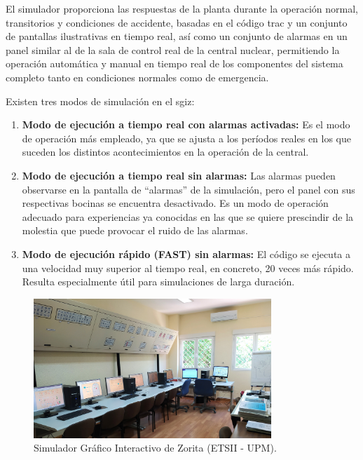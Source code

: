 El simulador proporciona las respuestas de la planta durante la operación normal, transitorios y condiciones de accidente, basadas en el código \acrshort{trac} y un conjunto de pantallas ilustrativas en tiempo real, así como un conjunto de alarmas en un panel similar al de la sala de control real de la central nuclear, permitiendo la operación automática y manual en tiempo real de los componentes del sistema completo tanto en condiciones normales como de emergencia.

Existen tres modos de simulación en el \acrshort{sgiz}:

\begin{enumerate}
  \item \textbf{Modo de ejecución a tiempo real con alarmas activadas:} Es el modo de operación más empleado, ya que se ajusta a los períodos reales en los que suceden los distintos acontecimientos en la operación de la central.
  \item \textbf{Modo de ejecución a tiempo real sin alarmas:} Las alarmas pueden observarse en la pantalla de ``alarmas'' de la simulación, pero el panel con sus respectivas bocinas se encuentra desactivado. Es un modo de operación adecuado para experiencias ya conocidas en las que se quiere prescindir de la molestia que puede provocar el ruido de las alarmas.
  \item \textbf{Modo de ejecución rápido (FAST) sin alarmas:} El código se ejecuta a una velocidad muy superior al tiempo real, en concreto, 20 veces más rápido. Resulta especialmente útil para simulaciones de larga duración.
\end{enumerate}


\begin{figure}[!h]
  \centering
  \includegraphics[width=0.8\textwidth]{content/figures/sgiz.jpg}
  \caption{Simulador Gráfico Interactivo de Zorita (ETSII - UPM).}
  \label{fig:sgiz}
\end{figure}
